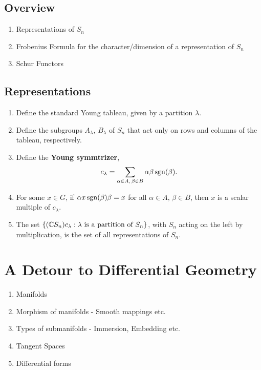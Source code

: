 \section{Overview}

\begin{enumerate}
    \makethislistcompact
    \item Representations of $S_n$
    \item Frobenius Formula for the character/dimension of a representation of $S_n$
    \item Schur Functors
\end{enumerate}

\section{Representations}


\begin{enumerate}
    \makethislistcompact
    \item Define the standard Young tableau, given by a partition $\lambda$.
    \item Define the subgroups $A_\lambda,\, B_\lambda$ of $S_n$ that act only on rows and columns of the tableau, respectively.
    \item Define the \textbf{Young symmtrizer},
        \begin{align}
            c_\lambda = \sum_{\substack{\alpha\in A,\, \beta\in B}} \alpha \beta \operatorname{sgn}(\beta).
        \end{align}
    \item For some $x\in G$, if $\alpha x \operatorname{sgn}(\beta)\beta = x$ for all $\alpha\in A,\, \beta\in B$, then $x$ is a scalar multiple of $c_\lambda$.
    \item The set $\{(\mathbb{C} S_n )c_\lambda : \lambda \text{ is a partition of } S_n\}$, with $S_n$ acting on the left by multiplication, is the set of all representations of $S_n$.
\end{enumerate}


\chapter{A Detour to Differential Geometry}
\label{cha:a_small_detour_to_differential_geometry}

\begin{enumerate}
    \makethislistcompact
    \item Manifolds
    \item Morphism of manifolds -  Smooth mappings etc.
    \item Types of submanifolds - Immersion, Embedding etc.
    \item Tangent Spaces
    \item Differential forms
\end{enumerate}

